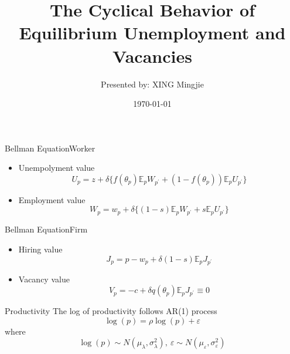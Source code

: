 \documentclass{beamer}
\title{The Cyclical Behavior of Equilibrium Unemployment and Vacancies\\
\citet{Shimer2005}}
\author{Presented by: XING Mingjie}
\date{\today}
\begin{document}
\begin{frame}
  \titlepage
\end{frame}

\begin{frame}{Bellman Equation}{Worker}
    \begin{itemize}
        \item Unempolyment value
            \begin{equation}\label{BellmanUnemploy}
                U_p = z + \delta \{f(\theta_p)\mathbb{E}_p W_{p^\prime} + (1-f(\theta_p))\mathbb{E}_p U_{p^\prime}\}
            \end{equation}
        \item Employment value
            \begin{equation}\label{BellmanEmploy}
                W_p = w_p + \delta \{(1-s)\mathbb{E}_p W_{p^\prime} + s\mathbb{E}_p U_{p^\prime}\}
            \end{equation}
    \end{itemize}
\end{frame}

\begin{frame}{Bellman Equation}{Firm}
    \begin{itemize}
        \item Hiring value
            \begin{equation}\label{BellmanHire}
                J_p = p - w_p + \delta (1-s)\mathbb{E}_p J_{p^\prime}
            \end{equation}
        \item Vacancy value
            \begin{equation}\label{BellmanVacancy}
                V_p = -c + \delta q(\theta_p)\mathbb{E}_p J_{p^\prime} \equiv 0
            \end{equation}
    \end{itemize}
\end{frame}

\begin{frame}{Productivity}
    The log of productivity follows AR(1) process
    \begin{equation}\label{productivityprocess}
    \log(p) = \rho \log(p) + \varepsilon 
    \end{equation}
    where \[\log(p) \sim N(\mu_\lambda, \sigma^2_\lambda),\ 
    \varepsilon \sim N(\mu_\varepsilon,\sigma^2_\varepsilon)\]
\end{frame}
\end{document}

